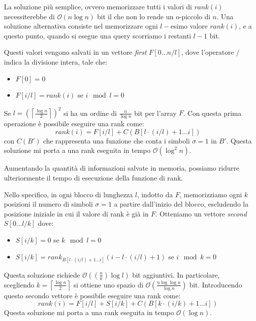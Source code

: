 La soluzione più semplice, ovvero memorizzare tutti i valori di $rank(i)$
necessiterebbe di $\mathcal{O}(n \log n)$ bit il che non lo rende un o-piccolo
di $n$. Una soluzione alternativa consiste nel memorizzare ogni $l-$esimo valore
$rank(i)$, e a questo punto, quando si esegue una query scorriamo i restanti $l
    - 1$ bit.

Questi valori vengono salvati in un vettore \textit{first} $F[0 \dots n / l]$,
dove l'operatore $/$ indica la divisione intera, tale che:
\begin{itemize}
    \item $F[0] = 0$
    \item $F[i / l] = rank(i)$ se $i \mod l = 0$
\end{itemize}
Se $l = \left(\left\lceil \frac{\log n}{2} \right\rceil \right)^2$ si ha un ordine
di $\frac{n}{\log n}$ bit per l'array $F$. Con questa prima operazione è possibile
eseguire una rank come:
\begin{equation}
    rank(i) = F[i/l] + C(B[l \cdot (i / l) + 1 \dots i])
\end{equation}
con $C(B')$ che rappresenta una funzione che conta i simboli $\sigma = 1$ in $B'$.
Questa soluzione mi porta a una rank eseguita in tempo $\mathcal{O}(\log^2 n)$.

Aumentando la quantità di informazioni salvate in memoria, possiamo ridurre
ulteriormente il tempo di esecuzione della funzione di rank.

Nello specifico, in ogni blocco di lunghezza $l$, indotto da $F$, memorizziamo
ogni $k$ posizioni il numero di simboli $\sigma = 1$ a partire dall'inizio del
blocco, escludendo la posizione iniziale in cui il valore di rank è già in $F$.
Otteniamo un vettore \textit{second} $S[0 \dots l /k]$ dove:
\begin{itemize}
    \item $S[i / k] = 0$ se $k \mod l = 0$
    \item $S[i / k] = rank_{B[l \cdot (i / l) + 1 \dots i]} (i - l \cdot (i / l)
              + 1)$ se $i \mod k = 0$
\end{itemize}
Questa soluzione richiede $\mathcal{O}\left(\left(\frac{n}{k}\right) \log l\right)$
bit aggiuntivi. In particolare, scegliendo $k = \left\lceil \frac{\log n}{2}
    \right\rceil$ si ottiene uno spazio di $\mathcal{O}(\frac{n \log \log n}{\log n})$
bit. Introducendo questo secondo vettore è possibile eseguire una rank come:
\begin{equation}
    rank(i) = F[i / l] + S[i / k] + C(B[k \cdot (i / k) + 1 \dots i])
\end{equation}
Questa soluzione mi porta a una rank eseguita in tempo $\mathcal{O}(\log n)$.

